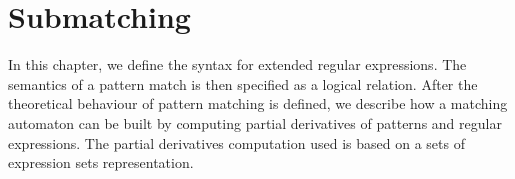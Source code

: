 \chapter{Submatching}

In this chapter, we define the syntax for extended regular expressions. The
semantics of a pattern match is then specified as a logical relation. After the
theoretical behaviour of pattern matching is defined, we describe how a matching
automaton can be built by computing partial derivatives of patterns and regular
expressions. The partial derivatives computation used is based on a sets of
expression sets representation.








